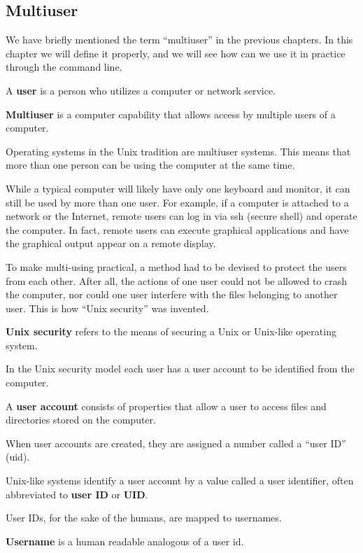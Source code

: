 \subsection{Multiuser}

We have briefly mentioned the term ``multiuser'' in the previous chapters. In this chapter we will define it properly,
and we will see how can we use it in practice through the command line.

\bd[User]
A \textbf{user} is a person who utilizes a computer or network service.
\ed

\bd[Multiuser]
\textbf{Multiuser} is a computer capability that allows access by multiple users of a computer.
\ed

Operating systems in the Unix tradition are multiuser systems. This means that more than one person can be using the
computer at the same time.

\be
While a typical computer will likely have only one keyboard and monitor, it can still be used by more than one user.
For example, if a computer is attached to a network or the Internet, remote users can log in via ssh (secure shell)
and operate the computer. In fact, remote users can execute graphical applications and have the graphical output
appear on a remote display.
\ee

To make multi-using practical, a method had to be devised to protect the users from each other. After all, the
actions of one user could not be allowed to crash the computer, nor could one user interfere with the files belonging
to another user. This is how ``Unix security'' was invented.

\textbf{Unix security} refers to the means of securing a Unix or Unix-like operating system.
\ed

In the Unix security model each user has a user account to be identified from the computer.

A \textbf{user account} consists of properties that allow a user to access files and directories stored on the computer.
\ed

When user accounts are created, they are assigned a number called a ``user ID'' (uid).

Unix-like systems identify a user account by a value called a user identifier, often abbreviated to \textbf{user ID} or
\textbf{UID}.
\ed

User IDs, for the sake of the humans, are mapped to usernames.

\bd[Username]
\textbf{Username} is a human readable analogous of a user id.
\ed

